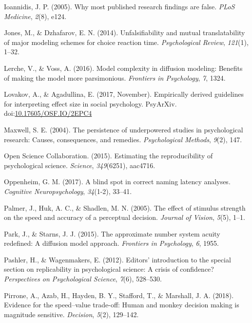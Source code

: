 \documentclass[floatsintext,doc]{apa6}
\theoremstyle{definition}
\theoremstyle{definition}
\theoremstyle{definition}
\theoremstyle{remark}
\begin{document}
\hypertarget{ref-ioannidis2005most}{}
Ioannidis, J. P. (2005). Why most published research findings are false.
\emph{PLoS Medicine}, \emph{2}(8), e124.

\hypertarget{ref-jones2014unfalsifiability}{}
Jones, M., \& Dzhafarov, E. N. (2014). Unfalsifiability and mutual
translatability of major modeling schemes for choice reaction time.
\emph{Psychological Review}, \emph{121}(1), 1--32.

\hypertarget{ref-lerche2016model}{}
Lerche, V., \& Voss, A. (2016). Model complexity in diffusion modeling:
Benefits of making the model more parsimonious. \emph{Frontiers in
Psychology}, \emph{7}, 1324.

\hypertarget{ref-lovakov_agadullina_2017}{}
Lovakov, A., \& Agadullina, E. (2017, November). Empirically derived
guidelines for interpreting effect size in social psychology. PsyArXiv.
doi:\href{https://doi.org/10.17605/OSF.IO/2EPC4}{10.17605/OSF.IO/2EPC4}

\hypertarget{ref-maxwell2004persistence}{}
Maxwell, S. E. (2004). The persistence of underpowered studies in
psychological research: Causes, consequences, and remedies.
\emph{Psychological Methods}, \emph{9}(2), 147.

\hypertarget{ref-open2015estimating}{}
Open Science Collaboration. (2015). Estimating the reproducibility of
psychological science. \emph{Science}, \emph{349}(6251), aac4716.

\hypertarget{ref-oppenheim2017blind}{}
Oppenheim, G. M. (2017). A blind spot in correct naming latency
analyses. \emph{Cognitive Neuropsychology}, \emph{34}(1-2), 33--41.

\hypertarget{ref-palmer2005effect}{}
Palmer, J., Huk, A. C., \& Shadlen, M. N. (2005). The effect of stimulus
strength on the speed and accuracy of a perceptual decision.
\emph{Journal of Vision}, \emph{5}(5), 1--1.

\hypertarget{ref-park2015approximate}{}
Park, J., \& Starns, J. J. (2015). The approximate number system acuity
redefined: A diffusion model approach. \emph{Frontiers in Psychology},
\emph{6}, 1955.

\hypertarget{ref-pashler2012editors}{}
Pashler, H., \& Wagenmakers, E. (2012). Editors' introduction to the
special section on replicability in psychological science: A crisis of
confidence? \emph{Perspectives on Psychological Science}, \emph{7}(6),
528--530.

\hypertarget{ref-pirrone2018evidence}{}
Pirrone, A., Azab, H., Hayden, B. Y., Stafford, T., \& Marshall, J. A.
(2018). Evidence for the speed--value trade-off: Human and monkey
decision making is magnitude sensitive. \emph{Decision}, \emph{5}(2),
129--142.
\end{document}
